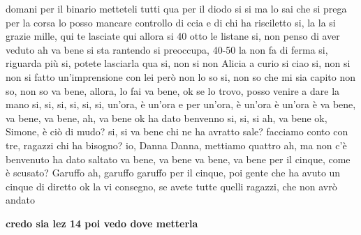 {domani per il binario metteteli tutti qua per il diodo si si ma lo sai che si prega per la corsa lo posso mancare controllo di ccia e di chi ha risciletto si, la la si grazie mille, qui te lasciate qui allora si 40 otto le listane si, non penso di aver veduto ah va bene si sta rantendo si preoccupa, 40-50 la non fa di ferma si, riguarda più si, potete lasciarla qua si, non si non Alicia a curio si ciao si, non si non si fatto un'imprensione con lei però non lo so si, non so che mi sia capito non so, non so va bene, allora, lo fai va bene, ok se lo trovo, posso venire a dare la mano si, si, si, si, si, si, un'ora, è un'ora e per un'ora, è un'ora è un'ora è va bene, va bene, va bene, ah, va bene ok ha dato benvenno si, si, si ah, va bene ok, Simone, è ciò di mudo? si, si va bene chi ne ha avratto sale? facciamo conto con tre, ragazzi chi ha bisogno? io, Danna Danna, mettiamo quattro ah, ma non c'è benvenuto ha dato saltato va bene, va bene va bene, va bene per il cinque, come è scusato? Garuffo ah, garuffo garuffo per il cinque, poi gente che ha avuto un cinque di diretto ok la vi consegno, se avete tutte quelli ragazzi, che non avrò andato

\textbf{credo sia lez 14 poi vedo dove metterla}

}
